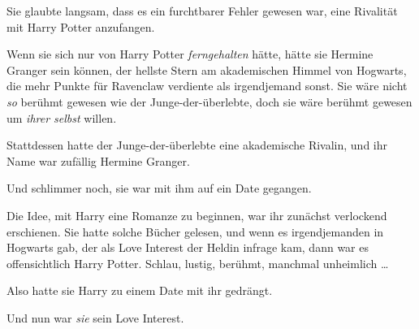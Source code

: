 Sie glaubte langsam, dass es ein furchtbarer Fehler gewesen war, eine Rivalität mit Harry Potter anzufangen.

Wenn sie sich nur von Harry Potter \emph{ferngehalten} hätte, hätte sie Hermine Granger sein können, der hellste Stern am akademischen Himmel von Hogwarts, die mehr Punkte für Ravenclaw verdiente als irgendjemand sonst. Sie wäre nicht \emph{so} berühmt gewesen wie der Junge-der-überlebte, doch sie wäre berühmt gewesen um \emph{ihrer selbst} willen.

Stattdessen hatte der Junge-der-überlebte eine akademische Rivalin, und ihr Name war zufällig Hermine Granger.

Und schlimmer noch, sie war mit ihm auf ein Date gegangen.

Die Idee, mit Harry eine Romanze zu beginnen, war ihr zunächst verlockend erschienen. Sie hatte solche Bücher gelesen, und wenn es irgendjemanden in Hogwarts gab, der als Love Interest der Heldin infrage kam, dann war es offensichtlich Harry Potter. Schlau, lustig, berühmt, manchmal unheimlich …

Also hatte sie Harry zu einem Date mit ihr gedrängt.

Und nun war \emph{sie} sein Love Interest.

